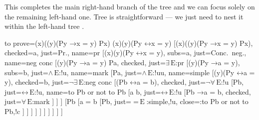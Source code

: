 \documentclass[10pt,british,a4paper]{ltxdoc}
\newcommand*{\lif}{\ensuremath{\mathbin{\rightarrow}}}
\newcommand*{\liff}{\ensuremath{\mathbin{\leftrightarrow}}}
\newcommand*{\elim}{\,\text{E}}
\begin{document}
This completes the main right-hand branch of the tree and we can focus solely on the remaining left-hand one.
Tree \nyth*{} is straightforward --- we just need to nest it within the left-hand tree \nyth[9].
\begin{latexcode}
\begin{prooftree}
  {
    to prove={(\exists x)((\forall y)(Py \lif x = y) \land Px) \sststile{}{} (\exists x)(\forall y)(Py \liff x = y)}
  }
  [{(\exists x)((\forall y)(Py \lif x = y) \land Px)}, checked=a, just=Pr., name=pr
    [{\lnot (\exists x)(\forall y)(Py \liff x = y)}, subs=a, just=Conc.~neg., name=neg conc
      [{(\forall y)(Py \lif a = y) \land Pa}, checked, just=$\exists\elim$:pr
        [{(\forall y)(Py \lif a = y)}, subs=b, just=$\land\elim$:!u, name=mark
          [Pa, just=$\land\elim$:!uu, name=simple
            [{\lnot (\forall y)(Py \liff a = y)}, checked=b, just=$\lnot\exists\elim$:neg conc
              [{\lnot (Pb \liff a = b)}, checked, just=$\lnot\forall\elim$:!u
                [Pb, just=$\liff\elim$:!u, name=to Pb or not to Pb
                 [a \neq b, just=$\liff\elim$:!u
                  [{Pb \lif a = b}, checked, just=$\forall\elim$:mark%
                  ]
                ]
                ]
                [\lnot Pb
                 [{a = b}
                    [Pb, just={$=\elim$:{simple,!u}}, close={:to Pb or not to Pb,!c}
                    ]
                 ]
                ]
              ]
            ]
          ]
        ]
      ]
    ]
  ]
\end{prooftree}
\end{latexcode}
\end{document}
